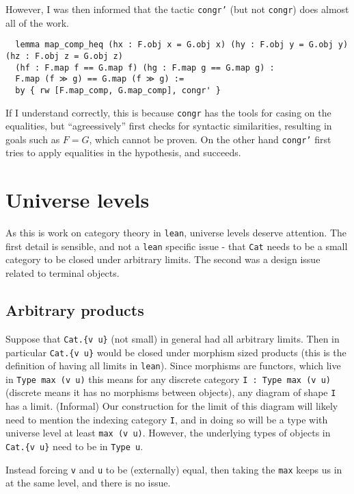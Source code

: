 \documentclass{article}
\newcommand{\<}{\langle}
\renewcommand{\>}{\rangle}
\theoremstyle{definitionstyle}
\theoremstyle{exercisestyle}
\theoremstyle{remarkstyle}
\begin{document}
However, I was then informed that the tactic \texttt{congr'}
(but not \texttt{congr}) does almost all of the work.

\begin{lstlisting}
  lemma map_comp_heq (hx : F.obj x = G.obj x) (hy : F.obj y = G.obj y) (hz : F.obj z = G.obj z)
  (hf : F.map f == G.map f) (hg : F.map g == G.map g) :
  F.map (f ≫ g) == G.map (f ≫ g) :=
  by { rw [F.map_comp, G.map_comp], congr' } \end{lstlisting}

If I understand correctly,
this is because \texttt{congr} has the tools for casing on the equalities,
but ``agreessively'' first checks for syntactic similarities,
resulting in goals such as $F = G$, which cannot be proven.
On the other hand \texttt{congr'} first tries to apply
equalities in the hypothesis, and succeeds.

\section{Universe levels}

As this is work on category theory in \texttt{lean},
universe levels deserve attention.
The first detail is sensible, and not a \texttt{lean} specific issue -
that \texttt{Cat} needs to be a small category to be closed under arbitrary limits.
The second was a design issue related to terminal objects.

\subsection{Arbitrary products}

Suppose that \texttt{Cat.\{v u\}} (not small) in general had all arbitrary limits.
Then in particular \texttt{Cat.\{v u\}} would be closed under morphism sized products
(this is the definition of having all limits in \texttt{lean}).
Since morphisms are functors, which live in \texttt{Type max (v u)}
this means for any discrete category \texttt{I : Type max (v u)}
(discrete means it has no morphisms between objects),
any diagram of shape \texttt{I} has a limit.
(Informal) Our construction for the limit of this diagram will
likely need to mention the indexing category \texttt{I},
and in doing so will be a type with universe level at least \texttt{max (v u)}.
However, the underlying types of objects in \texttt{Cat.\{v u\}} need to be in \texttt{Type u}.

Instead forcing \texttt{v} and \texttt{u} to be (externally) equal,
then taking the \texttt{max} keeps us in at the same level, and there is no issue.
\end{document}
